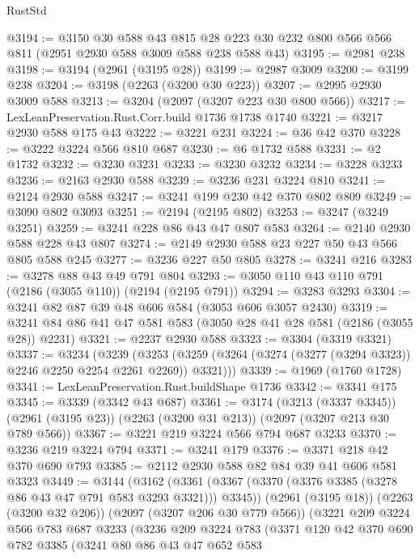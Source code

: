 \begin{lexlean}{RustStd}
\begin{coremodule}
@3194 := @3150
    @30
    @588
    @43
    @815
    @28
    @223
    @30
    @232
    @800
    @566
    @566
    @811
    (@2951 @2930 @588 @3009 @588 @238 @588 @43)
@3195 := @2981 @238
@3198 := @3194 (@2961 (@3195 @28))
@3199 := @2987 @3009
@3200 := @3199 @238
@3204 := @3198 (@2263 (@3200 @30 @223))
@3207 := @2995 @2930 @3009 @588
@3213 := @3204 (@2097 (@3207 @223 @30 @800 @566))
@3217 := LexLeanPreservation.Rust.Corr.build @1736 @1738 @1740
@3221 := @3217 @2930 @588 @175 @43
@3222 := @3221 @231
@3224 := @36 @42 @370
@3228 := @3222 @3224 @566 @810 @687
@3230 := @6 @1732 @588
@3231 := @2 @1732
@3232 := @3230 @3231
@3233 := @3230 @3232
@3234 := @3228 @3233
@3236 := @2163 @2930 @588
@3239 := @3236 @231 @3224 @810
@3241 := @2124 @2930 @588
@3247 := @3241 @199 @230 @42 @370 @802 @809
@3249 := @3090 @802 @3093
@3251 := @2194 (@2195 @802)
@3253 := @3247 (@3249 @3251)
@3259 := @3241 @228 @86 @43 @47 @807 @583
@3264 := @2140 @2930 @588 @228 @43 @807
@3274 := @2149 @2930 @588 @23 @227 @50 @43 @566 @805 @588 @245
@3277 := @3236 @227 @50 @805
@3278 := @3241 @216
@3283 := @3278 @88 @43 @49 @791 @804
@3293 := @3050 @110 @43 @110 @791 (@2186 (@3055 @110)) (@2194 (@2195 @791))
@3294 := @3283 @3293
@3304 := @3241 @82 @87 @39 @48 @606 @584 (@3053 @606 @3057 @2430)
@3319 := @3241 @84 @86 @41 @47 @581 @583 (@3050 @28 @41 @28 @581 (@2186 (@3055 @28)) @2231)
@3321 := @2237 @2930 @588
@3323 := @3304 (@3319 @3321)
@3337 := @3234
    (@3239
      (@3253 (@3259 (@3264 (@3274 (@3277 (@3294 @3323)) @2246 @2250 @2254 @2261 @2269)) @3321)))
@3339 := @1969 (@1760 @1728)
@3341 := LexLeanPreservation.Rust.buildShape @1736
@3342 := @3341 @175
@3345 := @3339 (@3342 @43 @687)
@3361 := @3174
    (@3213 (@3337 @3345))
    (@2961 (@3195 @23))
    (@2263 (@3200 @31 @213))
    (@2097 (@3207 @213 @30 @789 @566))
@3367 := @3221 @219 @3224 @566 @794 @687 @3233
@3370 := @3236 @219 @3224 @794
@3371 := @3241 @179
@3376 := @3371 @218 @42 @370 @690 @793
@3385 := @2112 @2930 @588 @82 @84 @39 @41 @606 @581 @3323
@3449 := @3144
    (@3162
      (@3361 (@3367 (@3370 (@3376 @3385 (@3278 @86 @43 @47 @791 @583 @3293 @3321))) @3345))
      (@2961 (@3195 @18))
      (@2263 (@3200 @32 @206))
      (@2097 (@3207 @206 @30 @779 @566))
      (@3221
        @209
        @3224
        @566
        @783
        @687
        @3233
        (@3236
          @209
          @3224
          @783
          (@3371
            @120
            @42
            @370
            @690
            @782
            @3385
            (@3241
              @80
              @86
              @43
              @47
              @652
              @583

\end{coremodule}
\end{lexlean}
